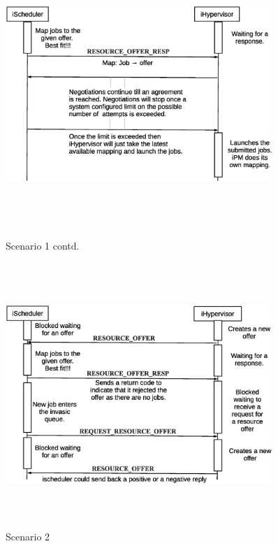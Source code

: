 \documentclass[a4paper, 12pt]{article}
\begin{document}
\clearpage
\vspace{-0.25in}
\begin{figure}[!htbp]
\centering
\includegraphics[width=0.9\textwidth, height=100mm]{./figures1.eps}
\caption{Scenario 1 contd.}
\label{fig:Seq1}
\vspace{0.25in}
\centering
\includegraphics[width=0.9\textwidth, height=100mm]{./figures2.eps}
\caption{Scenario 2}
\label{fig:Seq2}
\end{figure}
\clearpage
\end{document}
